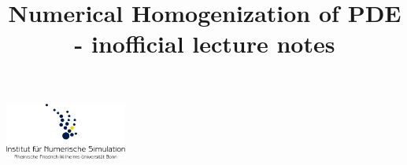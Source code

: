 \documentclass[11pt, USenglish, oneside]{book}
\begin{document}

\begin{titlepage}
	\includegraphics[width = 40mm]{logo.pdf}
	\begin{center}
 		\title{Numerical Homogenization of PDE - inofficial lecture notes}
	\end{center}
\end{titlepage}

\maketitle


\frontmatter
\tableofcontents

\mainmatter
{}


	
	
	
\backmatter
\cleardoublepage
{}
{}


\end{document}
